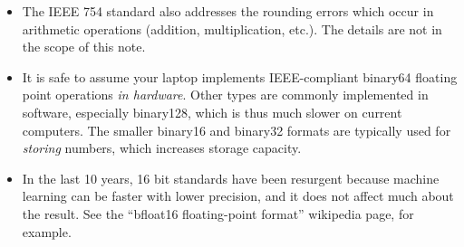 \documentclass[11pt]{amsart}
\begin{document}
\begin{itemize}
\item The IEEE 754 standard also addresses the rounding errors which occur in arithmetic operations (addition, multiplication, etc.).  The details are not in the scope of this note.

\item It is safe to assume your laptop implements IEEE-compliant binary64 floating point operations \emph{in hardware}.  Other types are commonly implemented in software, especially binary128, which is thus much slower on current computers.  The smaller binary16 and binary32 formats are typically used for \emph{storing} numbers, which increases storage capacity.

\item In the last 10 years, 16 bit standards have been resurgent because machine learning can be faster with lower precision, and it does not affect much about the result.  See the ``bfloat16 floating-point format'' wikipedia page, for example.
\end{itemize}
\end{document}

